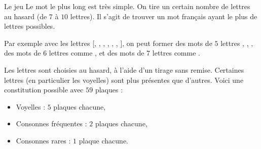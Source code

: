 \documentclass[11pt,class=report,crop=false]{standalone}
\begin{document}
\begin{cours}
Le jeu \og{}Le mot le plus long\fg{} est très simple. On tire un certain nombre de lettres au hasard (de $7$ à $10$ lettres). Il s'agit de trouver un mot français ayant le plus de lettres possibles.

Par exemple avec les lettres [, , , , , , ], on peut former des mots de $5$ lettres , , , des mots de $6$ lettres comme , et des mots de $7$ lettres comme .

Les lettres sont choisies au hasard, à l'aide d'un tirage sans remise. Certaines lettres (en particulier les voyelles) sont plus présentes que d'autres. 
Voici une constitution possible avec $59$ plaques  :
\begin{itemize}
  \item Voyelles  : $5$ plaques chacune,
  \item Consonnes fréquentes  : $2$ plaques chacune,
  \item Consonnes rares  : $1$ plaque chacune.
\end{itemize}

\end{cours}

\end{document}
